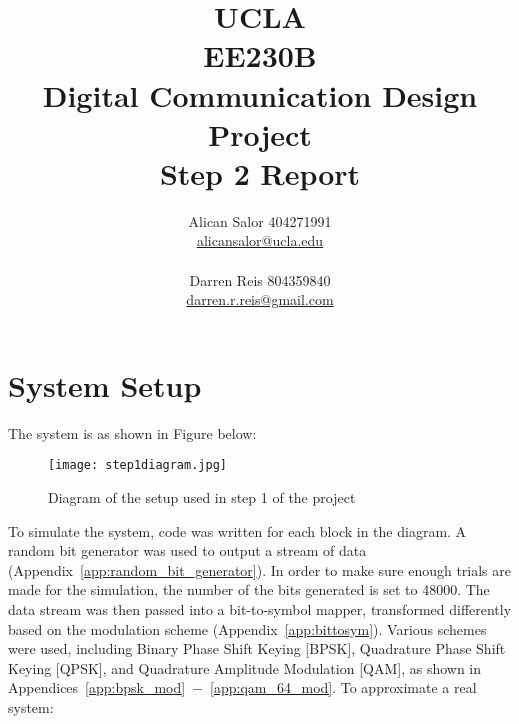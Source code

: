 \documentclass[]{article}
\title{UCLA\\EE230B\\Digital Communication Design Project\\Step 2 Report}
\author{Alican Salor 404271991 \\  \href{mailto:alicansalor@ucla.edu}{alicansalor@ucla.edu} \\ \\
Darren Reis 804359840 \\
\href{mailto:darrer.r.reis@gmail.com}{darren.r.reis@gmail.com} }
\begin{document}
\maketitle

\newpage
\tableofcontents

\newpage


\section{System Setup}
\label{sec:setup}
The system is as shown in Figure below:


\begin{figure}[H]
\centering
\texttt{[image: step1diagram.jpg]}
\caption{Diagram of the setup used in step 1 of the project}
\end{figure}

To simulate the system, code was written for each block in the diagram.  A random bit generator was used to output a stream of data (Appendix~\ref{app:random_bit_generator}). In order to make sure enough trials are made for the simulation, the number of the bits generated is set to 48000. The data stream was then passed into a bit-to-symbol mapper, transformed differently based on the modulation scheme (Appendix~\ref{app:bittosym}).  Various schemes were used, including Binary Phase Shift Keying [BPSK], Quadrature Phase Shift Keying [QPSK], and Quadrature Amplitude Modulation [QAM], as shown in Appendices~\ref{app:bpsk_mod}~$-$~\ref{app:qam_64_mod}. To approximate a real system:
\end{document}
